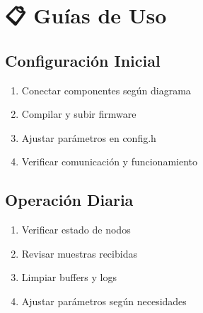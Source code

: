 \documentclass[a4paper,11pt,spanish]{sphinxmanual}
\begin{document}
\chapter{📋 Guías de Uso}
\label{\detokenize{index:guias-de-uso}}

\section{Configuración Inicial}
\label{\detokenize{index:configuracion-inicial}}\begin{enumerate}
%
\item {} 
\sphinxAtStartPar
{} Conectar componentes según diagrama

\item {} 
\sphinxAtStartPar
{} Compilar y subir firmware

\item {} 
\sphinxAtStartPar
{} Ajustar parámetros en config.h

\item {} 
\sphinxAtStartPar
{} Verificar comunicación y funcionamiento

\end{enumerate}


\section{Operación Diaria}
\label{\detokenize{index:operacion-diaria}}\begin{enumerate}
%
\item {} 
\sphinxAtStartPar
{} Verificar estado de nodos

\item {} 
\sphinxAtStartPar
{} Revisar muestras recibidas

\item {} 
\sphinxAtStartPar
{} Limpiar buffers y logs

\item {} 
\sphinxAtStartPar
{} Ajustar parámetros según necesidades

\end{enumerate}
\end{document}
